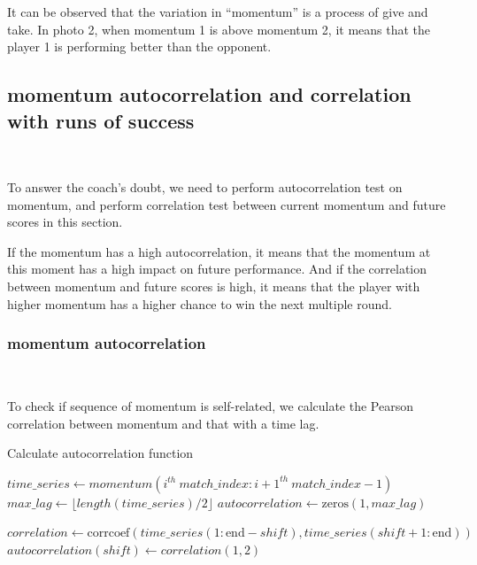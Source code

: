 It can be observed that the variation in ``momentum'' is a process of give and take.
In photo 2, when momentum 1 is above momentum 2, it means that the player 1 is performing better than the opponent. 

\subsection{momentum autocorrelation and correlation with runs of success}~{}

To answer the coach's doubt,
we need to perform autocorrelation test on momentum, 
and perform correlation test between current momentum and future scores
in this section.

If the momentum has a high autocorrelation, it means that the momentum at this moment 
has a high impact on future performance. And if the correlation between momentum and 
future scores is high, it means that the player with higher momentum has a higher
chance to win the next multiple round.

\subsubsection{momentum autocorrelation}~{}

To check if sequence of momentum is self-related, we calculate the Pearson correlation 
between momentum and that with a time lag.

\begin{algorithm}
    \caption{Calculate autocorrelation function}\label{alg:auto_corr}
    \begin{algorithmic}
            \State $time\_series \gets momentum(i^{th}\ match\_index: {i+1}^{th}\ match\_index - 1)$
            \State $max\_lag \gets \lfloor length(time\_series) / 2 \rfloor$ 
            \State $autocorrelation \gets \text{zeros}(1, max\_lag)$

                \State $correlation \gets \text{corrcoef}(time\_series(1 : \text{end} - shift), time\_series(shift + 1 : \text{end}))$
                \State $autocorrelation(shift) \gets correlation(1, 2)$
            \EndFor

        \EndFor
    \end{algorithmic}
\end{algorithm}

